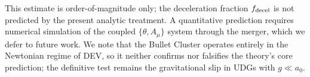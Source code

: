 \documentclass[aps,prd,twocolumn,showpacs,superscriptaddress]{revtex4-2}
\newcommand{\aO}{a_0}
\begin{document}
This estimate is order-of-magnitude only; the deceleration
fraction $f_{\rm decel}$ is not predicted by the present
analytic treatment. A quantitative prediction requires
numerical simulation of the coupled $\{\theta, A_\mu\}$
system through the merger, which we defer to future work.
We note that the Bullet Cluster operates entirely in the
Newtonian regime of DEV, so it neither confirms nor
falsifies the theory's core prediction; the definitive test
remains the gravitational slip in UDGs with $g \ll \aO$.




\end{document}
